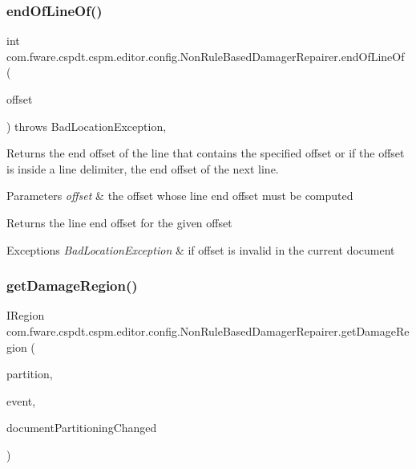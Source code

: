 \subsubsection{\texorpdfstring{end\+Of\+Line\+Of()}{endOfLineOf()}}
{\footnotesize\ttfamily int com.\+fware.\+cspdt.\+cspm.\+editor.\+config.\+Non\+Rule\+Based\+Damager\+Repairer.\+end\+Of\+Line\+Of (\begin{DoxyParamCaption}\item[{int}]{offset }\end{DoxyParamCaption}) throws Bad\+Location\+Exception\hspace{0.3cm}{\ttfamily [inline]}, {\ttfamily [protected]}}



Returns the end offset of the line that contains the specified offset or if the offset is inside a line delimiter, the end offset of the next line. 


\begin{DoxyParams}{Parameters}
{\em offset} & the offset whose line end offset must be computed \\
\hline
\end{DoxyParams}
\begin{DoxyReturn}{Returns}
the line end offset for the given offset 
\end{DoxyReturn}

\begin{DoxyExceptions}{Exceptions}
{\em Bad\+Location\+Exception} & if offset is invalid in the current document \\
\hline
\end{DoxyExceptions}
\mbox{\label{classcom_1_1fware_1_1cspdt_1_1cspm_1_1editor_1_1config_1_1_non_rule_based_damager_repairer_a6916df3bc6d3838ac23b4bdc7ab3799c}} 
\subsubsection{\texorpdfstring{get\+Damage\+Region()}{getDamageRegion()}}
{\footnotesize\ttfamily I\+Region com.\+fware.\+cspdt.\+cspm.\+editor.\+config.\+Non\+Rule\+Based\+Damager\+Repairer.\+get\+Damage\+Region (\begin{DoxyParamCaption}\item[{I\+Typed\+Region}]{partition,  }\item[{Document\+Event}]{event,  }\item[{boolean}]{document\+Partitioning\+Changed }\end{DoxyParamCaption})\hspace{0.3cm}{\ttfamily [inline]}}

